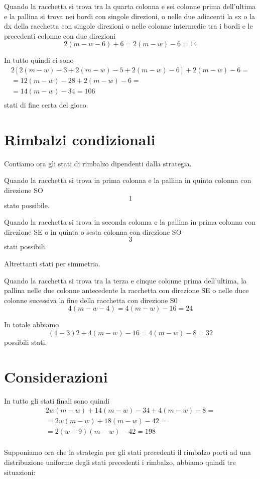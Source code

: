 \documentclass[a4paper,11pt]{article}
\begin{document}
Quando la racchetta si trova tra la quarta colonna e sei colonne prima dell'ultima e la pallina si trova nei bordi con singole direzioni, o nelle due adiacenti la sx o la dx della racchetta con singole direzioni o nelle colonne intermedie tra i bordi e le precedenti colonne con due direzioni
\[
2(m-w-6)+6 = 2(m-w)-6=14
\]

In tutto quindi ci sono
\[
\begin{array}{r}
 2[2(m-w)-3+2(m-w)-5+2(m-w)-6]+2(m-w)-6 = \\
 = 12(m-w)-28+2(m-w)-6 = \\
 = 14(m-w)-34 = 106 \\
\end{array}
\] stati di fine certa del gioco.

\section{Rimbalzi condizionali}

Contiamo ora gli stati di rimbalzo dipendenti dalla strategia.

Quando la racchetta si trova in prima colonna e la pallina in quinta colonna con direzione SO 
\[
1
\]
stato possibile.

Quando la racchetta si trova in seconda colonna e la pallina in prima colonna con direzione SE o in quinta o sesta colonna con direzione SO
\[
3
\]
stati possibili.

Altrettanti stati per simmetria.

Quando la racchetta si trova tra la terza e cinque colonne prima dell'ultima, la pallina nelle due colonne antecedente la racchetta
con direzione SE o nelle duce colonne sucessiva la fine della racchetta
con direzione S0
\[
4 (m-w-4)=4(m-w)-16=24
\]

In totale abbiamo
\[
(1+3)2+4(m-w)-16=4(m-w)-8=32
\]
possibili stati.

\section{Considerazioni}

In tutto gli stati finali sono quindi 
\[
\begin{array}{r}
 2w(m-w)+14(m-w)-34+4(m-w)-8= \\
 =2w(m-w)+18(m-w)-42= \\
 =2(w+9)(m-w)-42= 198\\
\end{array}
\]

Supponiamo ora che la strategia per gli stati precedenti il rimbalzo
porti ad una distribuzione uniforme degli stati precedenti i rimbalzo, abbiamo quindi tre situazioni:
\end{document}

